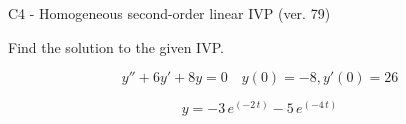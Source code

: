 \begin{exercise}
  \begin{exerciseTitle}C4 - Homogeneous second-order linear IVP (ver. 79)\end{exerciseTitle}
  \begin{exerciseStatement}
    
Find the solution to the given IVP.

    
\[y''+6y'+8y = 0 \hspace{1em} y(0) = -8 , y'(0) = 26\]

  \end{exerciseStatement}
  \begin{exerciseAnswer}
    
\[y= -3 \, e^{\left(-2 \, t\right)} - 5 \, e^{\left(-4 \, t\right)}\]

  \end{exerciseAnswer}
\end{exercise}